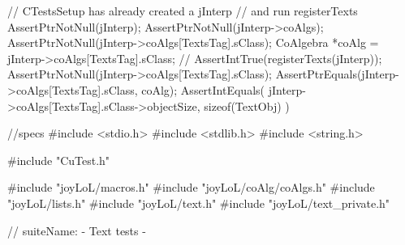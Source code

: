 \startCTest
  // CTestsSetup has already created a jInterp
  // and run registerTexts
  AssertPtrNotNull(jInterp);
  AssertPtrNotNull(jInterp->coAlgs);
  AssertPtrNotNull(jInterp->coAlgs[TextsTag].sClass);
  CoAlgebra *coAlg = jInterp->coAlgs[TextsTag].sClass;
//  AssertIntTrue(registerTexts(jInterp));
  AssertPtrNotNull(jInterp->coAlgs[TextsTag].sClass);
  AssertPtrEquals(jInterp->coAlgs[TextsTag].sClass, coAlg);
  AssertIntEquals(
    jInterp->coAlgs[TextsTag].sClass->objectSize,
    sizeof(TextObj)
  )
\stopCTest
\stopTestCase
\stopTestSuite

\starttyping
//specs
#include <stdio.h>
#include <stdlib.h>
#include <string.h>

#include "CuTest.h"

#include "joyLoL/macros.h"
#include "joyLoL/coAlg/coAlgs.h"
#include "joyLoL/lists.h"
#include "joyLoL/text.h"
#include "joyLoL/text_private.h"

// suiteName: - Text tests -

